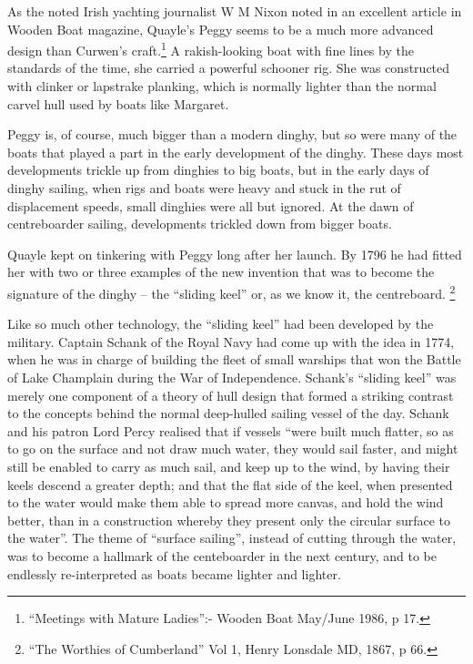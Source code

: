 \documentclass[
  letterpaper,
]{scrbook}
\begin{document}
As the noted Irish yachting journalist W M Nixon noted in an excellent
article in Wooden Boat magazine, Quayle's Peggy seems to be a much more
advanced design than Curwen's craft.\footnote{``Meetings with Mature
  Ladies'':- Wooden Boat May/June 1986, p 17.} A rakish-looking boat
with fine lines by the standards of the time, she carried a powerful
schooner rig. She was constructed with clinker or lapstrake planking,
which is normally lighter than the normal carvel hull used by boats like
Margaret.

Peggy is, of course, much bigger than a modern dinghy, but so were many
of the boats that played a part in the early development of the dinghy.
These days most developments trickle up from dinghies to big boats, but
in the early days of dinghy sailing, when rigs and boats were heavy and
stuck in the rut of displacement speeds, small dinghies were all but
ignored. At the dawn of centreboarder sailing, developments trickled
down from bigger boats.

Quayle kept on tinkering with Peggy long after her launch. By 1796 he
had fitted her with two or three examples of the new invention that was
to become the signature of the dinghy -- the ``sliding keel'' or, as we
know it, the centreboard. \footnote{``The Worthies of Cumberland'' Vol
  1, Henry Lonsdale MD, 1867, p 66.}

Like so much other technology, the ``sliding keel'' had been developed
by the military. Captain Schank of the Royal Navy had come up with the
idea in 1774, when he was in charge of building the fleet of small
warships that won the Battle of Lake Champlain during the War of
Independence. Schank's ``sliding keel'' was merely one component of a
theory of hull design that formed a striking contrast to the concepts
behind the normal deep-hulled sailing vessel of the day. Schank and his
patron Lord Percy realised that if vessels ``were built much flatter, so
as to go on the surface and not draw much water, they would sail faster,
and might still be enabled to carry as much sail, and keep up to the
wind, by having their keels descend a greater depth; and that the flat
side of the keel, when presented to the water would make them able to
spread more canvas, and hold the wind better, than in a construction
whereby they present only the circular surface to the water''. The theme
of ``surface sailing'', instead of cutting through the water, was to
become a hallmark of the centeboarder in the next century, and to be
endlessly re-interpreted as boats became lighter and lighter.
\end{document}
